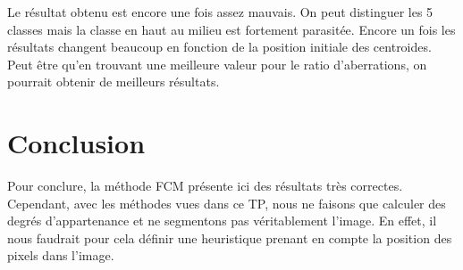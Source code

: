 \documentclass[a4paper,11pt]{article}
\begin{document}
Le résultat obtenu est encore une fois assez mauvais. On peut distinguer les 5 classes mais la classe en haut au milieu est fortement parasitée. Encore un fois les résultats changent beaucoup en fonction de la position initiale des centroides. Peut être qu'en trouvant une meilleure valeur pour le ratio d'aberrations, on pourrait obtenir de meilleurs résultats.

\clearpage

\section{Conclusion}
Pour conclure, la méthode FCM présente ici des résultats très correctes. Cependant, avec les méthodes vues dans ce TP, nous ne faisons que calculer des degrés d'appartenance et ne segmentons pas véritablement l'image. En effet, il nous faudrait pour cela définir une heuristique prenant en compte la position des pixels dans l'image.
\end{document}
